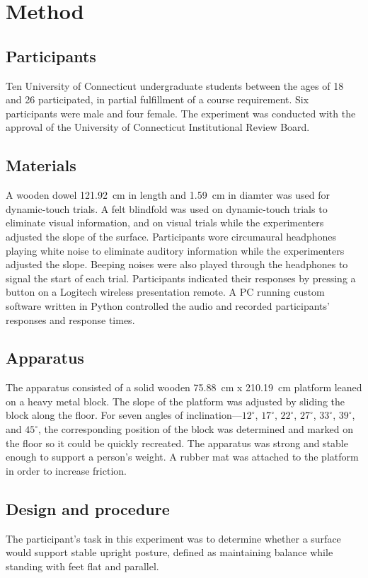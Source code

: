 \documentclass{article}
\begin{document}
\section{Method}
\subsection{Participants}
Ten University of Connecticut undergraduate students between the ages of 18 and 26 participated, in partial fulfillment of a course requirement. Six participants were male and four female. The experiment was conducted with the approval of the University of Connecticut Institutional Review Board.

\subsection{Materials}
A wooden dowel 121.92~cm in length and 1.59~cm in diamter was used for dynamic-touch trials. A felt blindfold was used on dynamic-touch trials to eliminate visual information, and on visual trials while the experimenters adjusted the slope of the surface. Participants wore circumaural headphones playing white noise to eliminate auditory information while the experimenters adjusted the slope. Beeping noises were also played through the headphones to signal the start of each trial.  Participants indicated their responses by pressing a button on a Logitech wireless presentation remote. A PC running custom software written in Python controlled the audio and recorded participants' responses and response times.

\subsection{Apparatus}
The apparatus consisted of a solid wooden 75.88~cm x 210.19~cm platform leaned on a heavy metal block. The slope of the platform was adjusted by sliding the block along the floor. For seven angles of inclination---$12^\circ$, $17^\circ$, $22^\circ$, $27^\circ$, $33^\circ$, $39^\circ$, and $45^\circ$, the corresponding position of the block was determined and marked on the floor so it could be quickly recreated. The apparatus was strong and stable enough to support a person's weight. A rubber mat was attached to the platform in order to increase friction.

\subsection{Design and procedure}
The participant's task in this experiment was to determine whether a surface would support stable upright posture, defined as maintaining balance while standing with feet flat and parallel.
\end{document}
